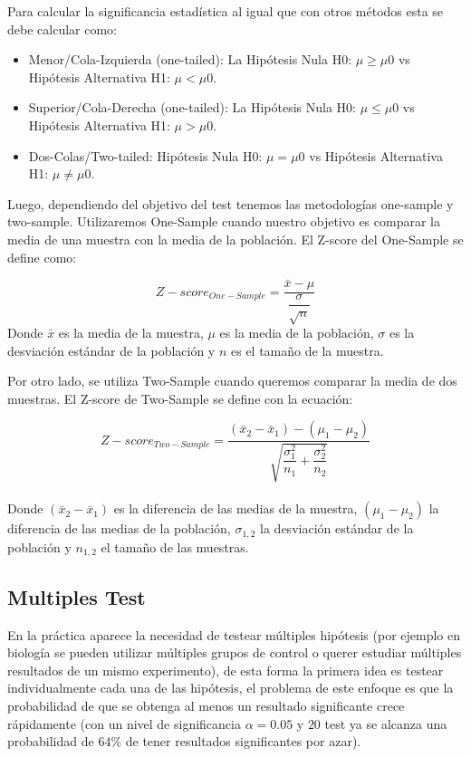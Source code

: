 \documentclass[]{article}
\providecommand{\tightlist}{%
  \setlength{\itemsep}{0pt}\setlength{\parskip}{0pt}}
\begin{document}
Para calcular la significancia estadística al igual que con otros
métodos esta se debe calcular como:

\begin{itemize}
\tightlist
\item
  Menor/Cola-Izquierda (one-tailed): La Hipótesis Nula H0:
  \(\mu \geq \mu0\) vs Hipótesis Alternativa H1: \(\mu < \mu0\).
\item
  Superior/Cola-Derecha (one-tailed): La Hipótesis Nula H0:
  \(\mu \leq \mu0\) vs Hipótesis Alternativa H1: \(\mu > \mu0\).
\item
  Dos-Colas/Two-tailed: Hipótesis Nula H0: \(\mu = \mu0\) vs Hipótesis
  Alternativa H1: \(\mu \neq \mu0\).
\end{itemize}

Luego, dependiendo del objetivo del test tenemos las metodologías
one-sample y two-sample. Utilizaremos One-Sample cuando nuestro objetivo
es comparar la media de una muestra con la media de la población. El
Z-score del One-Sample se define como:

\[Z-score_{One-Sample} = \dfrac{\bar x - \mu}{\dfrac{\sigma}{\sqrt n}}\]
Donde \(\bar x\) es la media de la muestra, \(\mu\) es la media de la
población, \(\sigma\) es la desviación estándar de la población y \(n\)
es el tamaño de la muestra.

Por otro lado, se utiliza Two-Sample cuando queremos comparar la media
de dos muestras. El Z-score de Two-Sample se define con la ecuación:

\[Z-score_{Two-Sample} = \dfrac{(\bar x_2 - \bar x_1) - (\mu_1 - \mu_2)}{\sqrt{\dfrac{\sigma_1^2}{n_1}+\dfrac{\sigma_2^2}{n_2}}}\]\\
Donde \((\bar x_2 - \bar x_1)\) es la diferencia de las medias de la
muestra, \((\mu_1 - \mu_2)\) la diferencia de las medias de la
población, \(\sigma_{1,2}\) la desviación estándar de la población y
\(n_{1,2}\) el tamaño de las muestras.

\hypertarget{multiples-test}{%
\subsection{Multiples Test}\label{multiples-test}}

En la práctica aparece la necesidad de testear múltiples hipótesis (por
ejemplo en biología se pueden utilizar múltiples grupos de control o
querer estudiar múltiples resultados de un mismo experimento), de esta
forma la primera idea es testear individualmente cada una de las
hipótesis, el problema de este enfoque es que la probabilidad de que se
obtenga al menos un resultado significante crece rápidamente (con un
nivel de significancia \(\alpha = 0.05\) y \(20\) test ya se alcanza una
probabilidad de \(64\%\) de tener resultados significantes por azar).
\end{document}
